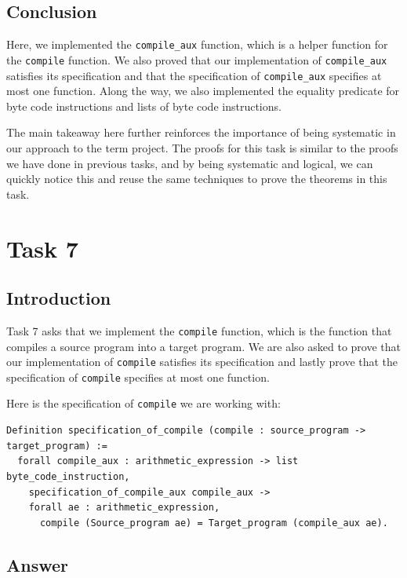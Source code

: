 \documentclass{article}
\begin{document}
\subsection{Conclusion}

Here, we implemented the \texttt{compile\_aux} function, which is a helper function for the \texttt{compile} function. We also proved that our implementation of \texttt{compile\_aux} satisfies its specification and that the specification of \texttt{compile\_aux} specifies at most one function. Along the way, we also implemented the equality predicate for byte code instructions and lists of byte code instructions.

The main takeaway here further reinforces the importance of being systematic in our approach to the term project. The proofs for this task is similar to the proofs we have done in previous tasks, and by being systematic and logical, we can quickly notice this and reuse the same techniques to prove the theorems in this task.

\section{Task 7}

\subsection{Introduction}

Task 7 asks that we implement the \texttt{compile} function, which is the function that compiles a source program into a target program. We are also asked to prove that our implementation of \texttt{compile} satisfies its specification and lastly prove that the specification of \texttt{compile} specifies at most one function.

Here is the specification of \texttt{compile} we are working with:

\begin{lstlisting}
Definition specification_of_compile (compile : source_program -> target_program) :=
  forall compile_aux : arithmetic_expression -> list byte_code_instruction,
    specification_of_compile_aux compile_aux ->
    forall ae : arithmetic_expression,
      compile (Source_program ae) = Target_program (compile_aux ae).
\end{lstlisting}

\subsection{Answer}
\end{document}
